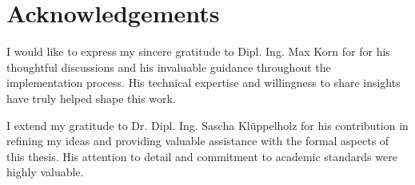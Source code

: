 \documentclass[preview]{standalone}
\begin{document}
	\clearpage
	\thispagestyle{empty}
	\section*{Acknowledgements}	
	I would like to express my sincere gratitude to Dipl. Ing. Max Korn for for his thoughtful discussions and his invaluable guidance throughout the implementation process. His technical expertise and willingness to share insights have truly helped shape this work. \newline
	
	\noindent I extend my gratitude to Dr. Dipl. Ing. Sascha Klüppelholz for his contribution in refining my ideas and providing valuable assistance with the formal aspects of this thesis. His attention to detail and commitment to academic standards were highly valuable.
	
%
\end{document}

